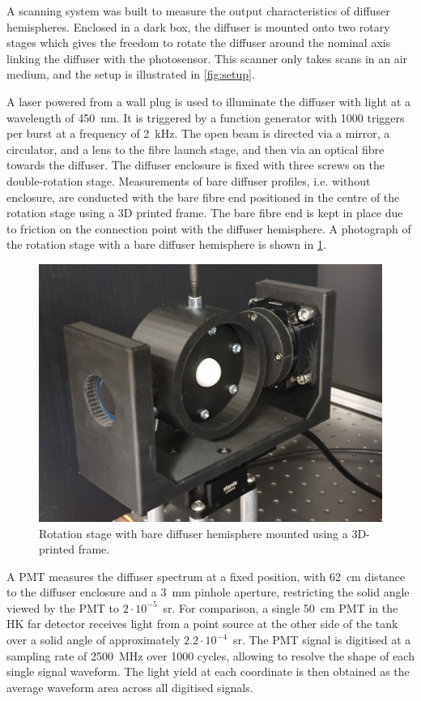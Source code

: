 \documentclass[a4paper,11pt]{article}
\begin{document}
A scanning system was built to measure the output characteristics of diffuser hemispheres. Enclosed in a dark box, the diffuser is mounted onto two rotary stages which gives the freedom to rotate the diffuser around the nominal axis linking the diffuser with the photosensor. This scanner only takes scans in an air medium, and the setup is illustrated in \cref{fig:setup}. 

A laser powered from a wall plug is used to illuminate the diffuser with light at  a wavelength of 450~nm. It is triggered by a function generator with 1000 triggers per burst at a frequency of 2~kHz. 
The open beam is directed via a mirror, a circulator, and a lens to the fibre launch stage, and then via an optical fibre towards the diffuser. The diffuser enclosure is fixed with three screws on the double-rotation stage. Measurements of bare diffuser profiles, i.e. without enclosure, are conducted with the bare fibre end positioned in the centre of the rotation stage using a 3D printed frame. The bare fibre end is kept in place due to friction on the connection point with the diffuser hemisphere. A photograph of the rotation stage with a bare diffuser hemisphere is  shown in \cref{fig:difftest_rotstage}.

\begin{figure}
    \centering    
    \includegraphics[height=.35\textwidth]{bare_scan_setup.jpg}%
    \caption{Rotation stage with bare diffuser hemisphere mounted using a 3D-printed frame.} 
    \label{fig:difftest_rotstage}
\end{figure}

A PMT measures the diffuser spectrum at a fixed position, with 62~cm distance to the diffuser enclosure and a 3~mm pinhole aperture, restricting the solid angle viewed by the PMT to $2\cdot10^{-5}$~sr. For comparison, a single 50~cm PMT in the HK far detector receives light from a point source at the other side of the tank over a solid angle of approximately $2.2\cdot10^{-4}$~sr.
The PMT signal is digitised at a sampling rate of 2500~MHz over 1000 cycles, allowing to resolve the shape of each single signal waveform. The light yield at each coordinate is then obtained as the average waveform area across all digitised signals. 
\end{document}
